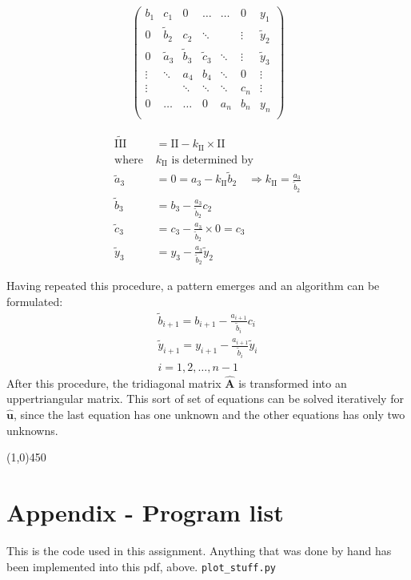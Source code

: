 \documentclass[11pt,a4paper,notitlepage]{article}
\begin{document}
\begin{minipage}{0.5\linewidth}
\begin{align*}
\left(\begin{matrix}
  b_1   & c_1    & 0      & \dots   & \dots  & 0       & y_1     \\
  0   & \tilde{b}_2    & c_2    & \ddots  &        & \vdots  & \tilde{y}_2  \\
  0     & \tilde{a}_3    & \tilde{b}_3    & \tilde{c}_3     & \ddots & \vdots  & \tilde{y}_3  \\
 \vdots & \ddots & a_4    & b_4     & \ddots & 0       & \vdots  \\
 \vdots &        & \ddots & \ddots  & \ddots & c_n     & \vdots  \\
  0     & \dots  & \dots  & 0       & a_{n}  & b_n     & y_{n}   \\
\end{matrix}\right)
\end{align*}
\end{minipage}
\begin{minipage}{0.5\linewidth}
	\begin{align*}
	\tilde{\text{III}} &= \text{II} - k_\text{II} \times \text{II}\\
	\text{where }&k_\text{II} \text{ is determined by}\\
\tilde{a}_3 &= 0 = a_3 - k_\text{II}\tilde{b}_2 \quad \Rightarrow k_\text{II} = \frac{a_3}{\tilde{b}_2}\\
	\tilde{b}_3 &= b_3 - \frac{a_3}{\tilde{b}_2} c_2 \\
	\tilde{c}_3 &= c_3 - \frac{a_3}{\tilde{b}_2} \times 0 = c_3 \\
	\tilde{y}_3 &= y_3 - \frac{a_3}{\tilde{b}_2} \tilde{y}_2
	\end{align*}
\end{minipage}

Having repeated this procedure, a pattern emerges and an algorithm can be formulated:
\begin{align*}
	\tilde{b}_{i+1} = b_{i+1} - \frac{a_{i+1}}{\tilde{b}_i} c_{i} \\
	\tilde{y}_{i+1} = y_{i+1} - \frac{a_{i+1}}{\tilde{b}_i} \tilde{y}_i \\
	i = 1,2,\dots, n-1
\end{align*}
After this procedure, the tridiagonal matrix $\mathbf{\hat{A}}$ is transformed into an uppertriangular matrix. This sort of set of equations can be solved iteratively for $\mathbf{\hat{u}}$, since the last equation has one unknown and the other equations has only two unknowns.

\begin{center}
\line(1,0){450}
\end{center}

\newpage
\section{Appendix - Program list}
This is the code used in this assignment. Anything that was done by hand has been implemented into this pdf, above.
\lstset{style=pystyle}
\verb|plot_stuff.py|

\end{document}
